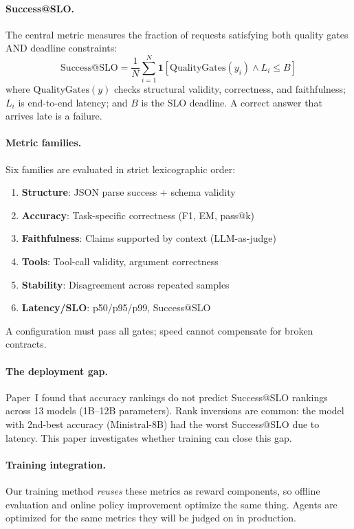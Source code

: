 \documentclass[11pt]{article}
\begin{document}
\paragraph{Success@SLO.}
The central metric measures the fraction of requests satisfying both quality gates AND deadline constraints:
\begin{equation}
\text{Success@SLO} = \frac{1}{N} \sum_{i=1}^{N} \mathbf{1}[\text{QualityGates}(y_i) \land L_i \leq B]
\end{equation}
where $\text{QualityGates}(y)$ checks structural validity, correctness, and faithfulness; $L_i$ is end-to-end latency; and $B$ is the SLO deadline.
A correct answer that arrives late is a failure.

\paragraph{Metric families.}
Six families are evaluated in strict lexicographic order:
\begin{enumerate}[leftmargin=12pt]
    \item \textbf{Structure}: JSON parse success + schema validity
    \item \textbf{Accuracy}: Task-specific correctness (F1, EM, pass@k)
    \item \textbf{Faithfulness}: Claims supported by context (LLM-as-judge)
    \item \textbf{Tools}: Tool-call validity, argument correctness
    \item \textbf{Stability}: Disagreement across repeated samples
    \item \textbf{Latency/SLO}: p50/p95/p99, Success@SLO
\end{enumerate}
A configuration must pass all gates; speed cannot compensate for broken contracts.

\paragraph{The deployment gap.}
Paper~I found that accuracy rankings do not predict Success@SLO rankings across 13 models (1B--12B parameters).
Rank inversions are common: the model with 2nd-best accuracy (Ministral-8B) had the worst Success@SLO due to latency.
This paper investigates whether training can close this gap.

\paragraph{Training integration.}
Our training method \emph{reuses} these metrics as reward components, so offline evaluation and online policy improvement optimize the same thing.
Agents are optimized for the same metrics they will be judged on in production.
\end{document}
